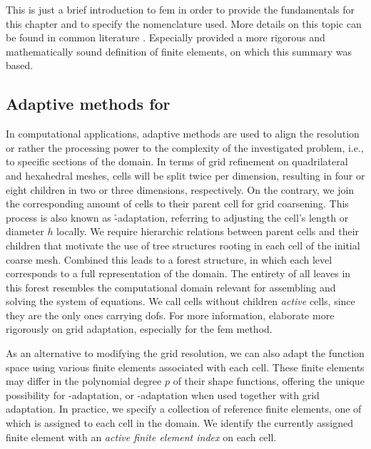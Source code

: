 This is just a brief introduction to \gls{fem} in order to provide the fundamentals for this chapter and to specify the nomenclature used. More details on this topic can be found in common literature \parencite[e.g.,][]{quarteroni1994, ern2004, elman2014}. Especially \textcite{brenner2008} provided a more rigorous and mathematically sound definition of finite elements, on which this summary was based.


\subsection{Adaptive methods for }

In computational applications, adaptive methods are used to align the resolution or rather the processing power to the complexity of the investigated problem, i.e., to specific sections of the domain. In terms of grid refinement on quadrilateral and hexahedral meshes, cells will be split twice per dimension, resulting in four or eight children in two or three dimensions, respectively. On the contrary, we join the corresponding amount of cells to their parent cell for grid coarsening. This process is also known as \h-adaptation, referring to adjusting the cell's length or diameter \(h\) locally. We require hierarchic relations between parent cells and their children that motivate the use of tree structures rooting in each cell of the initial coarse mesh. Combined this leads to a forest structure, in which each level corresponds to a full representation of the domain. The entirety of all leaves in this forest resembles the computational domain relevant for assembling and solving the system of equations. We call cells without children \textit{active} cells, since they are the only ones carrying \glspl{dof}. For more information, \textcite{bangerth2003} elaborate more rigorously on grid adaptation, especially for the \gls{fem} method.

As an alternative to modifying the grid resolution, we can also adapt the function space using various finite elements associated with each cell. These finite elements may differ in the polynomial degree $p$ of their shape functions, offering the unique possibility for \p-adaptation, or \hp-adaptation when used together with grid adaptation. In practice, we specify a collection of reference finite elements, one of which is assigned to each cell in the domain. We identify the currently assigned finite element with an \textit{active finite element index} on each cell.

